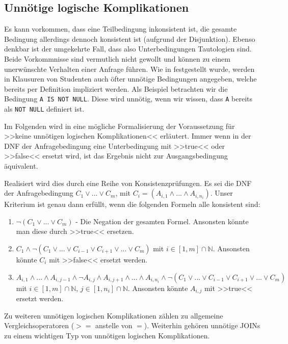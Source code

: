 \subsection{Unnötige logische Komplikationen}

Es kann vorkommen, dass eine Teilbedingung inkonsistent ist, die gesamte Bedingung allerdings dennoch konsistent ist (aufgrund der Disjunktion). Ebenso denkbar ist der umgekehrte Fall, dass also Unterbedingungen Tautologien sind. Beide Vorkommnisse sind vermutlich nicht gewollt und können zu einem unerwünschte Verhalten einer Anfrage führen. Wie in \cite{brass2} festgestellt wurde, werden in Klausuren von Studenten auch öfter unnötige Bedingungen angegeben, welche bereits per Definition impliziert werden. Als Beispiel betrachten wir die Bedingung \verb|A IS NOT NULL|. Diese wird unnötig, wenn wir wissen, dass \verb|A| bereits als \verb|NOT NULL| definiert ist.

Im Folgenden wird in \cite{brass2} eine mögliche Formalisierung der Voraussetzung für >>keine unnötigen logischen Komplikationen<< erläutert. Immer wenn in der DNF der Anfragebedingung eine Unterbedingung mit >>true<< oder >>false<< ersetzt wird, ist das Ergebnis nicht zur Ausgangsbedingung äquivalent.

Realisiert wird dies durch eine Reihe von Konsistenzprüfungen. Es sei die DNF der Anfragebedingung $C_1\vee ...\vee C_m$, mit $C_i=(A_{i,1}\wedge ...\wedge A_{i,n_i})$. Unser Kriterium ist genau dann erfüllt, wenn die folgenden Formeln alle konsistent sind:

\begin{enumerate}
\item $\neg(C_1 \vee ... \vee C_m)$ - Die Negation der gesamten Formel. Ansonsten könnte man diese durch >>true<< ersetzen.
\item $C_1 \wedge \neg(C_1 \vee ... \vee C_{i-1} \vee C_{i+1} \vee ... \vee C_m)$ mit $i\in [1,m]\cap \mathbb{N}$. Ansonsten könnte $C_i$ mit >>false<< ersetzt werden.
\item  $A_{i,1} \wedge ... \wedge A_{i,j-1} \wedge  \neg A_{i,j} \wedge A_{i,j+1} \wedge ... \wedge A_{i,n_i} \wedge \neg(C_1 \vee ... \vee C_{i-1} \vee C_{i+1} \vee ... \vee C_m)$ mit $i\in [1,m] \cap \mathbb{N}$, $j\in [1,n_i]\cap \mathbb{N}$. Ansonsten könnte $A_{i,j}$ mit >>true<< ersetzt werden.
\end{enumerate}

Zu weiteren unnötigen logischen Komplikationen zählen zu allgemeine Vergleichsoperatoren ($>=$ anstelle von $=$). Weiterhin gehören unnötige JOINs zu einem wichtigen Typ von unnötigen logischen Komplikationen.

